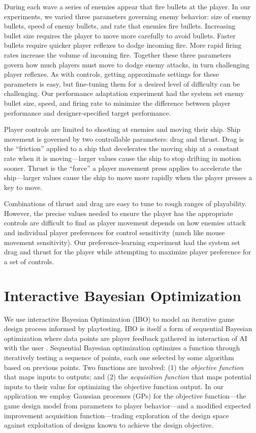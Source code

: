 \documentclass[letterpaper]{article}
\begin{document}
During each wave a series of enemies appear that fire bullets at the player. In our experiments, we varied three parameters governing enemy behavior: size of enemy bullets, speed of enemy bullets, and rate that enemies fire bullets. Increasing bullet size requires the player to move more carefully to avoid bullets. Faster bullets require quicker player reflexes to dodge incoming fire. More rapid firing rates increase the volume of incoming fire. Together these three parameters govern how much players must move to dodge enemy attacks, in turn challenging player reflexes. As with controls, getting approximate settings for these parameters is easy, but fine-tuning them for a desired level of difficulty can be challenging. Our performance adaptation experiment had the system set enemy bullet size, speed, and firing rate to minimize the difference between player performance and designer-specified target performance.


Player controls are limited to shooting at enemies and moving their ship. 
Ship movement is governed by two controllable parameters: drag and thrust. Drag is the ``friction'' applied to a ship that decelerates the moving ship at a constant rate when it is moving---larger values cause the ship to stop drifting in motion sooner. Thrust is the ``force'' a player movement press applies to accelerate the ship---larger values cause the ship to move more rapidly when the player presses a key to move. 

Combinations of thrust and drag are easy to tune to rough ranges of playability. However, the precise values needed to ensure the player has the appropriate controls are difficult to find as player movement depends on how enemies attack and individual player preferences for control sensitivity (much like mouse movement sensitivity). Our preference-learning experiment had the system set drag and thrust for the player while attempting to maximize player preference for a set of controls.




\section{Interactive Bayesian Optimization}
We use interactive Bayesian Optimization (IBO) to model an iterative game design process informed by playtesting. IBO is itself a form of sequential Bayesian optimization where data points are player feedback gathered in interaction of AI with the user \cite{brochu2010:thesis}.
Sequential Bayesian optimization optimizes a function through iteratively testing a sequence of points, each one selected by some algorithm based on previous points. 
Two functions are involved: (1) the \textit{objective function} that maps inputs to outputs; and (2) the \textit{acquisition function} that maps potential inputs to their value for optimizing the objective function output. 
In our application we employ Gaussian processes (GPs) for the objective function---the game design model from parameters to player behavior---and a modified expected improvement acquisition function---trading exploration of the design space against exploitation of designs known to achieve the design objective.
\end{document}
